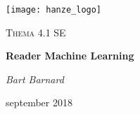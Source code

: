\begin{titlepage}
	\centering
	\texttt{[image: hanze\_logo]}\par\vspace{1cm}
	\vspace{4cm}
	{\scshape\Large Thema 4.1 SE\par}
	\vspace{1.5cm}
	{\huge\bfseries Reader Machine Learning\par}
	\vspace{2cm}
	{\Large\itshape Bart Barnard\par}
	\vfill
	
	{\large september 2018\par}
\end{titlepage}

\tableofcontents
\newpage
